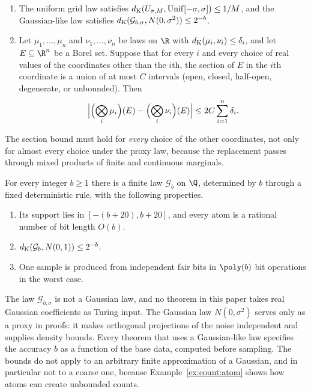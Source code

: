 \begin{lemma}\label{lem:count:transfer}
\begin{enumerate}[label=(\alph*)]
\item The uniform grid law satisfies
 $d_{\rm K}(U_{\sigma,M},\mathrm{Unif}[-\sigma,\sigma])\le1/M$, and
 the Gaussian-like law satisfies
 $d_{\rm K}(\mathcal G_{b,\sigma},N(0,\sigma^2))\le2^{-b}$.
\item Let $\mu_1,\dots,\mu_n$ and $\nu_1,\dots,\nu_n$ be laws on $\R$ with
 $d_{\rm K}(\mu_i,\nu_i)\le\delta_i$, and let $E\subseteq\R^n$ be a Borel
 set. Suppose that for every $i$ and every choice of real values of the
 coordinates other than the $i$th, the section of $E$ in the $i$th coordinate
 is a union of at most $C$ intervals (open, closed, half-open, degenerate, or
 unbounded). Then
 \[
  \Bigl|\Bigl(\bigotimes_i\mu_i\Bigr)(E)-\Bigl(\bigotimes_i\nu_i\Bigr)(E)\Bigr|
  \le2C\sum_{i=1}^n\delta_i .
 \]
\end{enumerate}
\end{lemma}

The section bound must hold for \emph{every} choice of the other
coordinates, not only for almost every choice under the proxy law, because
the replacement passes through mixed products of finite and continuous
marginals.

\begin{lemma}\label{lem:count:gauss-sampler}
For every integer $b\ge1$ there is a finite law $\mathcal G_b$ on $\Q$,
determined by $b$ through a fixed deterministic rule, with the following
properties.
\begin{enumerate}[label=(\alph*)]
\item Its support lies in $[-(b+20),b+20]$, and every atom is a rational
 number of bit length $O(b)$.
\item $d_{\rm K}(\mathcal G_b,N(0,1))\le2^{-b}$.
\item One sample is produced from independent fair bits in $\poly(b)$ bit
 operations in the worst case.
\end{enumerate}
\end{lemma}

The law $\mathcal G_{b,\sigma}$ is not a Gaussian law, and no theorem in this
paper takes real Gaussian coefficients as Turing input. The Gaussian law
$N(0,\sigma^2)$ serves only as a proxy in proofs: it makes orthogonal
projections of the noise independent and supplies density bounds. Every
theorem that uses a Gaussian-like law specifies the accuracy $b$ as a
function of the base data, computed before sampling. The bounds do not
apply to an arbitrary finite approximation of a Gaussian, and in particular
not to a coarse one, because Example~\ref{ex:count:atom} shows how atoms can
create unbounded counts.

